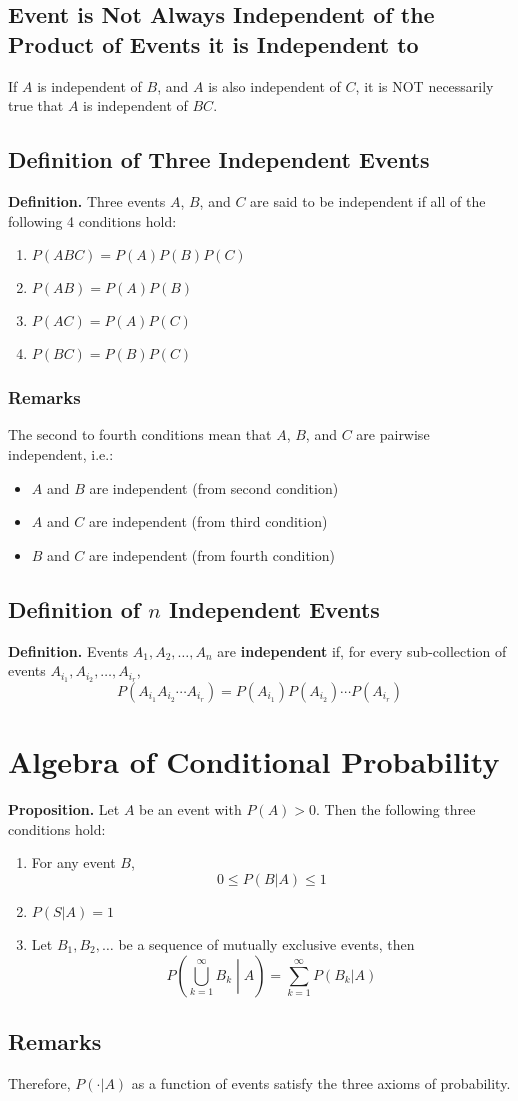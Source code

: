 \documentclass[../st2131_notes.tex]{subfiles}
\begin{document}
\subsection{Event is Not Always Independent of the Product of Events it is Independent to}
If \(A\) is independent of \(B\), and \(A\) is also independent of \(C\), it is NOT necessarily true that \(A\) is independent of \(BC\).

\subsection{Definition of Three Independent Events}
\textbf{Definition.} Three events \(A\), \(B\), and \(C\) are said to be independent if all of the following 4 conditions hold:
\begin{enumerate}
	\item\(P(ABC)=P(A)P(B)P(C)\)
	\item\(P(AB)=P(A)P(B)\)
	\item\(P(AC)=P(A)P(C)\)
	\item\(P(BC)=P(B)P(C)\)
\end{enumerate}

\subsubsection{Remarks}
The second to fourth conditions mean that \(A\), \(B\), and \(C\) are pairwise independent, i.e.:
\begin{itemize}
	\item\(A\) and \(B\) are independent (from second condition)
	\item\(A\) and \(C\) are independent (from third condition)
	\item\(B\) and \(C\) are independent (from fourth condition)
\end{itemize}

\subsection{Definition of $n$ Independent Events}
\textbf{Definition.} Events \(A_1,A_2,\ldots,A_n\) are \textbf{independent} if, for every sub-collection of events \(A_{i_1},A_{i_2},\ldots,A_{i_r}\),
\[P(A_{i_1}A_{i_2}\cdots A_{i_r})=P(A_{i_1})P(A_{i_2})\cdots P(A_{i_r})\]

\section{Algebra of Conditional Probability}
\textbf{Proposition.} Let \(A\) be an event with \(P(A)>0\). Then the following three conditions hold:
\begin{enumerate}
	\item For any event \(B\),
	\[0\leq P(B\vert A)\leq1\]
	\item\(P(S\vert A)=1\)
	\item Let \(B_1,B_2,\ldots\) be a sequence of mutually exclusive events, then
	\[P\left(\bigcup_{k=1}^\infty B_k\middle\vert A\right)=\sum_{k=1}^\infty P(B_k\vert A)\]
\end{enumerate}

\subsection{Remarks}
Therefore, \(P(\cdot\vert A)\) as a function of events satisfy the three axioms of probability.
\end{document}
